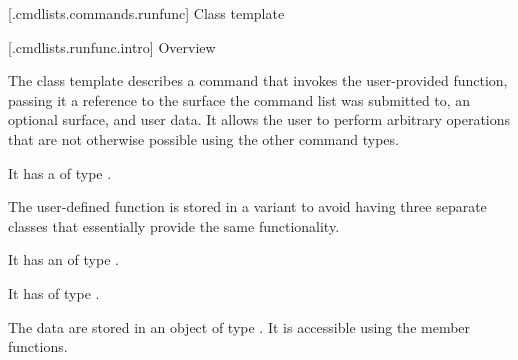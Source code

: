 
 [\iotwod.cmdlists.commands.runfunc] {Class template }

 [\iotwod.cmdlists.runfunc.intro] {Overview}

\pnum
{}%
The class template  describes a command that invokes the user-provided function, passing it a reference to the surface the command list was submitted to, an optional surface, and user data. It allows the user to perform arbitrary operations that are not otherwise possible using the other command types.

\pnum
It has a  of type .

\pnum
\begin{note}
The user-defined function is stored in a variant to avoid having three separate classes that essentially provide the same functionality.
\end{note}

\pnum
It has an  of type .

\pnum
It has  of type .

\pnum
The data are stored in an object of type . It is accessible using the  member functions.

